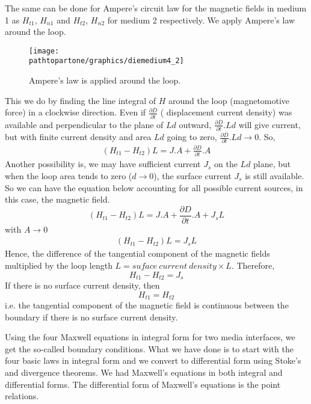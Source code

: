 The same can be done for Ampere's circuit law for the magnetic fields in medium 1 as $H_{t1}$, $H_{n1}$ and $H_{t2}$, $H_{n2}$ for medium 2 respectively. We apply Ampere's law around the loop.
\begin{figure}[h]
\centering
\texttt{[image: \\pathtopartone/graphics/diemedium4\_2]}
\caption{Ampere's law is applied around the loop.}
\end{figure}
This we do by finding the line integral of $H$ around the loop (magnetomotive force) in a clockwise direction. Even if $\frac{\partial\bar{D}}{\partial t}$ ( displacement current density) was available and perpendicular to the plane of $Ld$ outward, $\frac{\partial\bar{D}}{\partial t}. Ld$ will give current, but with finite current density and area $Ld$ going to zero,  $\frac{\partial\bar{D}}{\partial t}. Ld \rightarrow 0 $. So,
\begin{align*}
(H_{t1} - H_{t2})L = J.A +\frac{\partial D}{\partial t}.A
\end{align*}
Another possibility is, we may have sufficient current $J_s$ on the $Ld$ plane, but when the loop area tends to zero ($d \rightarrow 0 $), the surface current $J_s$ is still available. So we can have the equation below accounting for all possible current sources, in this case, the magnetic field.
\begin{equation}
(H_{t1} - H_{t2})L = J.A +\frac{\partial D}{\partial t}.A + J_sL
\end{equation}
with $A \rightarrow 0$
\begin{align*}
(H_{t1} - H_{t2})L = J_sL
\end{align*}
Hence, the difference of the tangential component of the magnetic fields multiplied by the loop length $L = suface\ current\ density \times L$. Therefore,
\begin{equation}
H_{t1} - H_{t2} = J_s
\end{equation}
If there is no surface current density, then 
\begin{equation}
H_{t1} = H_{t2}
\end{equation}
i.e. the tangential component of the magnetic field is continuous between the boundary if there is no surface current density.

Using the four Maxwell equations in integral form for two media interfaces, we get the so-called boundary conditions. What we have done is to start with the four basic laws in integral form and we convert to differential form using Stoke's and divergence theorems. We had Maxwell's equations in both integral and differential forms. The differential form of Maxwell's equations is the point relations.

